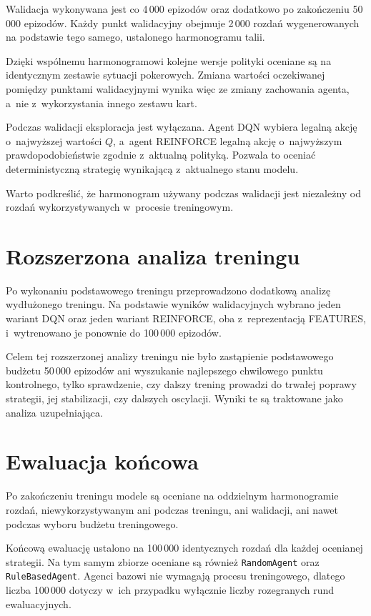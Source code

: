 Walidacja wykonywana jest co 4\,000 epizodów oraz dodatkowo po zakończeniu
50\,000 epizodów. Każdy punkt walidacyjny obejmuje 2\,000 rozdań
wygenerowanych na podstawie tego samego, ustalonego harmonogramu talii.

Dzięki wspólnemu harmonogramowi kolejne wersje polityki oceniane są na
identycznym zestawie sytuacji pokerowych. Zmiana wartości oczekiwanej
pomiędzy punktami walidacyjnymi wynika więc ze zmiany zachowania
agenta, a~nie z~wykorzystania innego zestawu kart.

Podczas walidacji eksploracja jest wyłączana. Agent DQN wybiera legalną
akcję o~najwyższej wartości $Q$, a~agent REINFORCE legalną akcję
o~najwyższym prawdopodobieństwie zgodnie z~aktualną polityką. Pozwala
to oceniać deterministyczną strategię wynikającą z~aktualnego stanu
modelu.

Warto podkreślić, że harmonogram używany podczas walidacji jest niezależny
od rozdań wykorzystywanych w~procesie treningowym.

\section{Rozszerzona analiza treningu}

Po wykonaniu podstawowego treningu przeprowadzono
dodatkową analizę wydłużonego treningu. Na podstawie wyników
walidacyjnych wybrano jeden wariant DQN oraz jeden wariant REINFORCE,
oba z~reprezentacją FEATURES, i~wytrenowano je ponownie do 100\,000
epizodów.

Celem tej rozszerzonej analizy treningu nie było zastąpienie podstawowego budżetu 50\,000
epizodów ani wyszukanie najlepszego chwilowego punktu kontrolnego, tylko
sprawdzenie, czy dalszy trening prowadzi do trwałej poprawy strategii,
jej stabilizacji, czy dalszych oscylacji. Wyniki te są traktowane jako analiza uzupełniająca.

\section{Ewaluacja końcowa}

Po zakończeniu treningu modele są oceniane na oddzielnym harmonogramie
rozdań, niewykorzystywanym ani podczas treningu, ani walidacji, ani
nawet podczas wyboru budżetu treningowego.

Końcową ewaluację ustalono na 100\,000 identycznych rozdań dla każdej
ocenianej strategii. Na tym samym zbiorze oceniane są również
\texttt{RandomAgent} oraz \texttt{RuleBasedAgent}. Agenci bazowi nie
wymagają procesu treningowego, dlatego liczba 100\,000 dotyczy w~ich
przypadku wyłącznie liczby rozegranych rund ewaluacyjnych.

